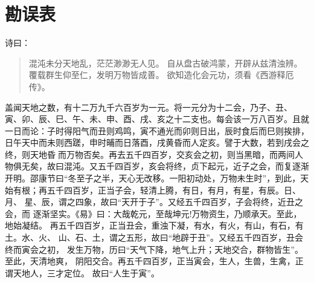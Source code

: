 \documentclass[twoside,openright,headings=optiontohead]{ctexbook} %
\begin{document}
	\frontmatter
%			
\newpage
{\color{TEXTColor}
	\begin{multicols}{2}
		\tableofcontents
	\end{multicols}
	\newpage
	\mainmatter

\mainmatter

\hypertarget{ux52d8ux8befux8868}{%
\chapter*{勘误表}\label{ux52d8ux8befux8868}}

诗曰：

\begin{quote}
混沌未分天地乱，茫茫渺渺无人见。
自从盘古破鸿蒙，开辟从兹清浊辨。
覆载群生仰至仁，发明万物皆成善。
欲知造化会元功，须看《西游释厄传》。
\end{quote}

盖闻天地之数，有十二万九千六百岁为一元。将一元分为十二会，乃子、丑、
寅、卯、辰、巳、午、未、申、酉、戌、亥之十二支也。每会该一万八百岁。且就
一日而论：子时得阳气而丑则鸡鸣，寅不通光而卯则日出，辰时食后而巳则挨排，
日午天中而未则西蹉，申时晡而日落酉，戌黄昏而人定亥。譬于大数，若到戌会之
终，则天地昏而万物否矣。再去五千四百岁，交亥会之初，则当黑暗，而两间人
物俱无矣，故曰混沌。又五千四百岁，亥会将终，贞下起元，近子之会，而复逐渐
开明。邵康节曰``冬至子之半，天心无改移。一阳初动处，万物未生时''，到此，天
始有根；再五千四百岁，正当子会，轻清上腾，有日，有月，有星，有辰。日、月、
星、辰，谓之四象，故曰``天开于子''。又经五千四百岁，子会将终，近丑之会，而
逐渐坚实。《易》曰：大哉乾元，至哉坤元!万物资生，乃顺承天。至此，地始凝结。
再五千四百岁，正当丑会，重浊下凝，有水，有火，有山，有石，有土。水、火、
山、石、土，谓之五形，故曰``地辟于丑''。又经五千四百岁，丑会终而寅会之初，
发生万物，历曰``天气下降，地气上升；天地交合，群物皆生''。至此，天清地爽，
阴阳交合。再五千四百岁，正当寅会，生人，生兽，生禽，正谓天地人，三才定位。
故曰``人生于寅''。

}
\end{document}
